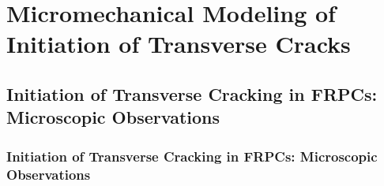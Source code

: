 \documentclass[first,firstsupp,lastsupp,last,hyperref,table]{ETHclass}
\begin{document}
\section{Micromechanical Modeling of Initiation of Transverse Cracks}

\subsection[Microscopic Observations]{Initiation of Transverse Cracking in FRPCs: Microscopic Observations}

\begin{frame}
\frametitle{\vspace{0.3cm}\small Initiation of Transverse Cracking in FRPCs: Microscopic Observations}
\vspace{-0.5cm}
\centering
\captionsetup[subfigure]{labelfont=footnotesize}
\begin{tikzpicture}



\end{tikzpicture}
\end{frame}
\end{document}
